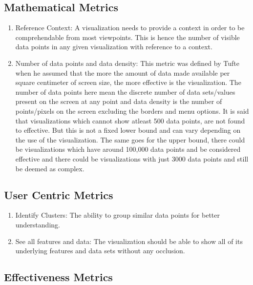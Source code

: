\documentclass[seploa]{beavtex}
\begin{document}
\subsection{Mathematical Metrics}

\begin{enumerate}
\item Reference Context: A visualization needs to provide a context in order to be comprehendable from most viewpoints. This is hence the number of visible data points in any given visualization with reference to a context\cite{brath1997}.

\item Number of data points and data density: This metric was defined by Tufte when he assumed that the more the amount of data made available per square centimeter of screen size, the more effective is the visualization. The number of data points here mean the discrete number of data sets/values present on the screen at any point and data density is the number of points/pixels on the screen excluding the borders and menu options. It is said that visualizations which cannot show atleast 500 data points, are not found to effective\cite{brath1997}. But this is not a fixed lower bound and can vary depending on the use of the visualization. The same goes for the upper bound, there could be visualizations which have around 100,000 data points and be considered effective and there could be visualizations with just 3000 data points and still be deemed as complex\cite{brath1997}.
\end{enumerate}

\subsection{User Centric Metrics}

\begin{enumerate}
\item Identify Clusters: The ability to group similar data points for better understanding\cite{grins2001}.

\item See all features and data: The visualization should be able to show all of its underlying features and data sets without any occlusion\cite{grins2001}.
\end{enumerate}

\subsection{Effectiveness Metrics}
\end{document}
